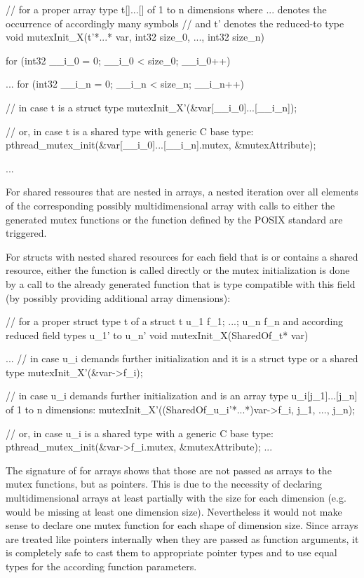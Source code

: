 \begin{ccode}
// for a proper array type t[]...[] of 1 to n dimensions where ... denotes the occurrence of accordingly many symbols 
// and t' denotes the reduced-to type
void mutexInit_X(t'*...* var, int32 size_0, ..., int32 size_n) { 
  for (int32 __i_0 = 0; __i_0 < size_0; __i_0++) { 
    ...
      for (int32 __i_n = 0; __i_n < size_n; __i_n++) {
        // in case t is a struct type
        mutexInit_X'(&var[__i_0]...[__i_n]);
        
        // or, in case t is a shared type with generic C base type:
        pthread_mutex_init(&var[__i_0]...[__i_n].mutex, &mutexAttribute);
      }
    ...
  } 
}
\end{ccode}
For shared ressoures that are nested in arrays, a nested iteration over all elements of the corresponding possibly multidimensional array with calls to either the generated mutex functions or the function defined by the POSIX standard are triggered.

For structs with nested shared resources for each field that is or contains a shared resource, either the  function is called directly or the mutex initialization is done by a call to the already generated function that is type compatible with this field (by possibly providing additional array dimensions):

\begin{ccode}
// for a proper struct type t of a struct t { u_1 f_1; ...; u_n f_n } and according reduced field types u_1' to u_n'
void mutexInit_X(SharedOf_t* var) {
  ...
  // in case u_i demands further initialization and it is a struct type or a shared type
  mutexInit_X'(&var->f_i);
  
  // in case u_i demands further initialization and is an array type u_i[j_1]...[j_n] of 1 to n dimensions:
  mutexInit_X'((SharedOf_u_i'*...*)var->f_i, j_1, ..., j_n);
  
  // or, in case u_i is a shared type with a generic C base type:
  pthread_mutex_init(&var->f_i.mutex, &mutexAttribute);
  ...
}
\end{ccode}
The signature of  for arrays shows that those are not passed as arrays to the mutex functions, but as pointers. This is due to the necessity of declaring multidimensional arrays at least partially with the size for each dimension (e.g.  would be missing at least one dimension size). Nevertheless it would not make sense to declare one mutex function for each shape of dimension size. Since arrays are treated like pointers internally when they are passed as function arguments, it is completely safe to cast them to appropriate pointer types and to use equal types for the according function parameters.

